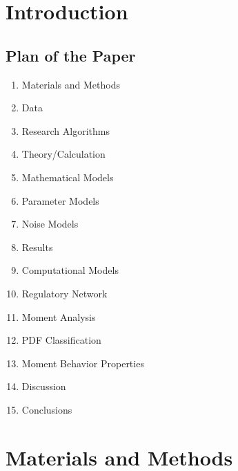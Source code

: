 



\section{Introduction}

\subsection{Plan of the Paper}

\begin{enumerate}
	\item Materials and Methods
	\item Data
	\item Research Algorithms
	\item Theory/Calculation
	\item Mathematical Models
	\item Parameter Models
	\item Noise Models
	\item Results
	\item Computational Models
	\item Regulatory Network
	\item Moment Analysis
	\item PDF Classification
	\item Moment Behavior Properties
	\item Discussion
	\item Conclusions
\end{enumerate}


\section{Materials and Methods}
